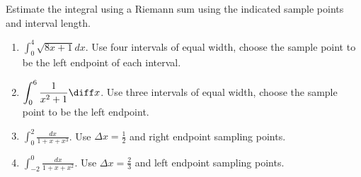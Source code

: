 Estimate the integral using a Riemann sum using the indicated sample points and interval length.
\begin{enumerate}
\item $\displaystyle \int_0^4 \sqrt{8x+1}dx$. Use four intervals of equal width, choose the sample point to be the left endpoint of each interval. 


\item $\displaystyle \int_0^6 \frac{1}{x^2+1} \diff x$. Use three intervals of equal width, choose the sample point to be the left endpoint. 


\item $\displaystyle\int_{0}^2 \frac{dx}{1+x+x^3}$. Use $\Delta x=\frac{1}2 $ and right endpoint sampling points.

\item $\displaystyle\int_{-2}^{0} \frac{dx}{1+x+x^2}$. Use $\Delta x=\frac23 $ and left endpoint sampling points.


\end{enumerate}
